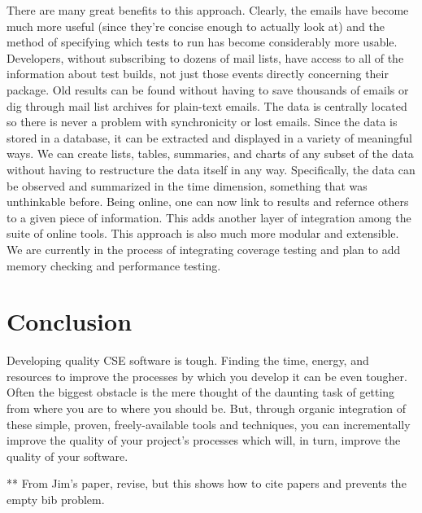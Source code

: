 \documentclass[12pt,relax]{article}
\begin{document}
There are many great benefits to this approach.  Clearly, the emails have
become much more useful (since they're concise enough to actually look at) and
the method of specifying which tests to run has become considerably more usable.
Developers, without subscribing to dozens of mail lists, have access to all of
the information about test builds, not just those events directly concerning
their package.  Old results can be found without having to save thousands of
emails or dig through mail list archives for plain-text emails.  The data
is centrally located so there is never a problem with synchronicity or lost
emails.  Since the data is stored in a database, it can be extracted and
displayed in a variety of meaningful ways.  We can create lists, tables,
summaries, and charts of any subset of the data without having to restructure
the data itself in any way.  Specifically, the data can be observed and
summarized in the time dimension, something that was unthinkable before.  
Being online, one can now link to results and refernce others to a given piece
of information.  This adds another layer of integration among the suite of
online tools.  This approach is also much more modular and extensible.  We are
currently in the process of integrating coverage testing and plan to add 
memory checking and performance testing.  

\clearpage


\section{Conclusion}
\label{Section:Conclusion}

Developing quality CSE software is tough.  Finding the time, energy, and
resources to improve the processes by which you develop it can be even tougher.
Often the biggest obstacle is the mere thought of the daunting task of getting
from where you are to where you should be.  But, through organic integration of
these simple, proven, freely-available tools and techniques, you can
incrementally improve the quality of your project's processes which will, in
turn, improve the quality of your software.

\clearpage


** From Jim's paper, revise, but this shows how to cite papers and prevents the
empty bib problem.
\end{document}
